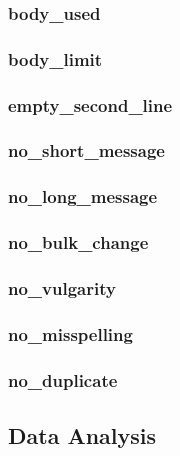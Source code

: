 \subsubsection{body_used}
\label{subs:body_used}

\subsubsection{body_limit}
\label{subs:body_limit}

\subsubsection{empty_second_line}
\label{subs:empty_second_line}

\subsubsection{no_short_message}
\label{subs:no_short_message}

\subsubsection{no_long_message}
\label{subs:no_long_message}

\subsubsection{no_bulk_change}
\label{subs:no_bulk_change}

\subsubsection{no_vulgarity}
\label{subs:no_vulgarity}

\subsubsection{no_misspelling}
\label{subs:no_misspelling}

\subsubsection{no_duplicate}
\label{subs:no_duplicate}


\subsection{Data Analysis}
\label{sub:analysis}

